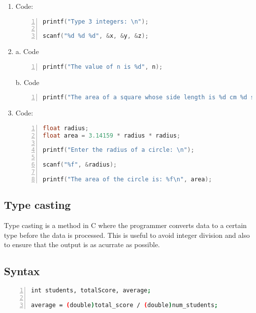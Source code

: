 \documentclass[12pt, letterpaper]{report}
\begin{document}
\begin{enumerate}
	\item Code:
\begin{lstlisting}[language=C,framexleftmargin=5mm,frame=single,xleftmargin=18pt,numbers=left,numberstyle=\tiny]
printf("Type 3 integers: \n");

scanf("%d %d %d", &x, &y, &z);
\end{lstlisting}
\item a. Code
\begin{lstlisting}[language=C,framexleftmargin=5mm,frame=single,xleftmargin=18pt,numbers=left,numberstyle=\tiny]
printf("The value of n is %d", n);
\end{lstlisting}
b. Code
\begin{lstlisting}[language=C,framexleftmargin=5mm,frame=single,xleftmargin=18pt,numbers=left,numberstyle=\tiny]
printf("The area of a square whose side length is %d cm %d square cm.", side, square);
\end{lstlisting}
\item Code:
\begin{lstlisting}[language=C,framexleftmargin=5mm,frame=single,xleftmargin=18pt,numbers=left,numberstyle=\tiny]
float radius;
float area = 3.14159 * radius * radius;

printf("Enter the radius of a circle: \n");

scanf("%f", &radius);

printf("The area of the circle is: %f\n", area);
\end{lstlisting}
\end{enumerate}

\subsection{Type casting}
Type casting is a method in C where the programmer converts data to a certain 
type before the data is processed. This is useful to avoid integer division and 
also to ensure that the output is as acurrate as possible.

\subsection*{Syntax}
\begin{lstlisting}[language=Bash,framexleftmargin=5mm,frame=single,xleftmargin=18pt,numbers=left,numberstyle=\tiny]
int students, totalScore, average;

average = (double)total_score / (double)num_students;
\end{lstlisting}
\end{document}
